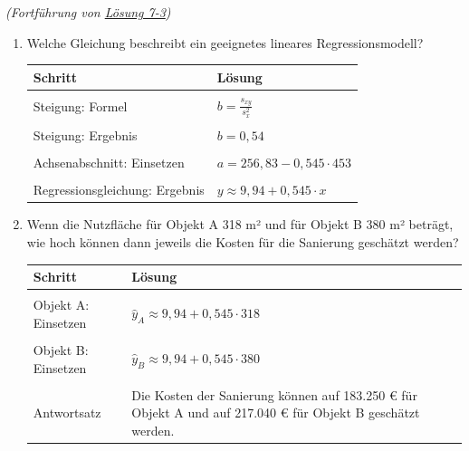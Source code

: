 \documentclass[
  11pt,
  ngerman,
  a4paper,
]{report}
\begin{document}
\emph{(Fortführung von \protect\hyperlink{loesung-7-3}{Lösung 7-3})}

\begin{enumerate}
\def\labelenumi{\alph{enumi})}
\item
  Welche Gleichung beschreibt ein geeignetes lineares Regressionsmodell?

  \begin{table}[H]
   \centering
   \begin{tabular}{>{\raggedright\arraybackslash}p{8cm}>{\raggedright\arraybackslash}p{8cm}}
   \toprule
   \textbf{Schritt} & \textbf{Lösung}\\
   \midrule
   \cellcolor{gray!6}{Regressionsgleichung: Formel} & \cellcolor{gray!6}{$y=a + b \cdot x$}\\
   Steigung: Formel & $b=\frac{s_{xy}}{s^2_x}$\\
   \cellcolor{gray!6}{Steigung: Einsetzen} & \cellcolor{gray!6}{$b=\frac{10150}{18614}$}\\
   Steigung: Ergebnis & $b=0{,}54$\\
   \cellcolor{gray!6}{Achsenabschnitt: Formel} & \cellcolor{gray!6}{$a=\bar{y}-b\cdot\bar{x}$}\\
   Achsenabschnitt: Einsetzen & $a=256{,}83-0{,}545\cdot453$\\
   \cellcolor{gray!6}{Achsenabschnitt: Ergebnis} & \cellcolor{gray!6}{$a=9{,}94$}\\
   Regressionsgleichung: Ergebnis & $y \approx 9{,}94 + 0{,}545 \cdot x$\\
   \bottomrule
   \end{tabular}
   \end{table}
\item
  Wenn die Nutzfläche für Objekt A 318 m² und für Objekt B 380 m² beträgt, wie hoch können dann jeweils die Kosten für die Sanierung geschätzt werden?

  \begin{table}[H]
   \centering
   \begin{tabular}{l>{\raggedright\arraybackslash}p{8cm}}
   \toprule
   \textbf{Schritt} & \textbf{Lösung}\\
   \midrule
   \cellcolor{gray!6}{Formel} & \cellcolor{gray!6}{$\hat{y}= 9{,}94 + 0{,}545 \cdot x$}\\
   Objekt A: Einsetzen & $\hat{y}_{A}\approx 9{,}94 + 0{,}545 \cdot 318$\\
   \cellcolor{gray!6}{Objekt A: Ergebnis} & \cellcolor{gray!6}{$\hat{y}_{A}\approx183{,}25$}\\
   Objekt B: Einsetzen & $\hat{y}_{B}\approx 9{,}94 + 0{,}545 \cdot 380$\\
   \cellcolor{gray!6}{Objekt B: Ergebnis} & \cellcolor{gray!6}{$\hat{y}_{B}\approx217{,}04$}\\
   Antwortsatz & Die Kosten der Sanierung können auf 183.250 € für Objekt A und auf 217.040 € für Objekt B geschätzt werden.\\
   \bottomrule
   \end{tabular}
   \end{table}
\end{enumerate}
\end{document}
